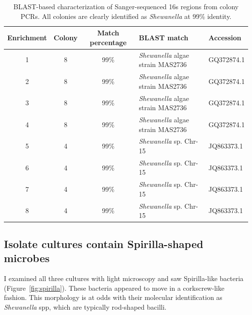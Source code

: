 \documentclass{article}
\begin{document}
\begin{table}
\centering
\begin{tabular}{|c|c|c|l|l|}
\hline
Enrichment & Colony & Match percentage & BLAST match & Accession \\
\hline
1 &
8 &
99\% &
{\em Shewanella} algae strain MAS2736 &
GQ372874.1 \\

2 &
8 &
99\% &
{\em Shewanella} algae strain MAS2736 &
GQ372874.1 \\

3 &
8 &
99\% &
{\em Shewanella} algae strain MAS2736 &
GQ372874.1 \\

4 &
8 &
99\% &
{\em Shewanella} algae strain MAS2736 &
GQ372874.1 \\

5 &
4 &
99\% &
{\em Shewanella} sp. Chr-15 &
JQ863373.1 \\

6 &
4 &
99\% &
{\em Shewanella} sp. Chr-15 &
JQ863373.1 \\

7 &
4 &
99\% &
{\em Shewanella} sp. Chr-15 &
JQ863373.1 \\

8 &
4 &
99\% &
{\em Shewanella} sp. Chr-15 &
JQ863373.1 \\
\hline
\end{tabular}
\caption{BLAST-based characterization of Sanger-sequenced 16s regions from colony PCRs.  All colonies are clearly identified as {\em Shewanella} at 99\% identity.}
\label{tab:16s}
\end{table}

\subsection*{Isolate cultures contain Spirilla-shaped microbes}

I examined all three cultures with light microscopy and saw
Spirilla-like bacteria (Figure~\ref{fig:spirilla}).  These bacteria
appeared to move in a corkscrew-like fashion.  This morphology is at
odds with their molecular identification as {\em Shewanella} spp, which are
typically rod-shaped bacilli.
\end{document}

